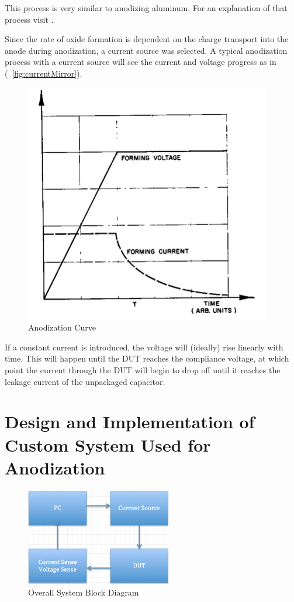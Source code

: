 \documentclass[journal]{IEEEtran}
\begin{document}
This process is very similar to anodizing aluminum. For an explanation of that process visit \cite{cwruEncAlanod}.

Since the rate of oxide formation is dependent on the charge transport into the anode during anodization, a current source was selected. A typical anodization process with a current source will see the current and voltage progress as in (~\ref{fig:currentMirror}).
 

\begin{figure}[here]
\centering
\includegraphics{anodCurve}
\caption{Anodization Curve \cite{tiMinit}}
\label{fig:anodCurve}
\end{figure}

If a constant current is introduced, the voltage will (ideally) rise linearly with time. This will happen until the DUT reaches the compliance voltage, at which point the current through the DUT will begin to drop off until it reaches the leakage current of the unpackaged capacitor. 

\section{Design and Implementation of Custom System Used for Anodization}

\begin{figure}[here]
\centering
\includegraphics[width=2.5in]{blockDiagram}
\caption{Overall System Block Diagram}
\label{fig:blockDiagram}
\end{figure}
\end{document}

